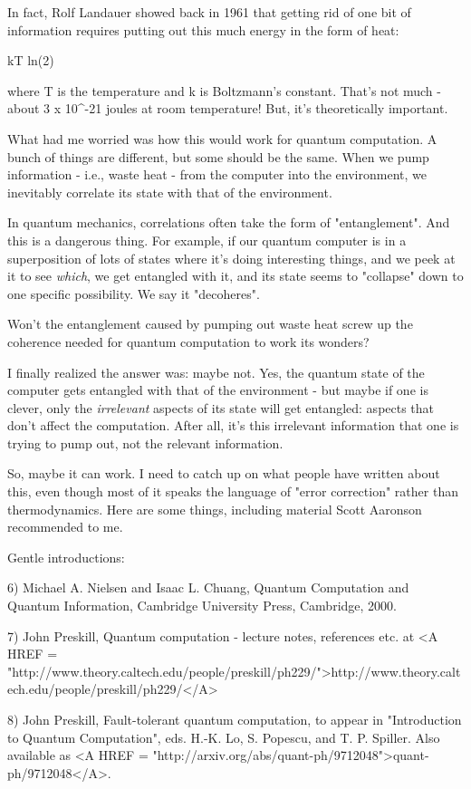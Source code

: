 In fact, Rolf Landauer showed back in 1961 that getting rid of 
one bit of information requires putting out this much energy 
in the form of heat:

kT ln(2)

where T is the temperature and k is Boltzmann's constant.  That's
not much - about 3 x 10^{-21} joules at room temperature!  But,
it's theoretically important.

What had me worried was how this would work for quantum computation.
A bunch of things are different, but some should be the same.  When 
we pump information - i.e., waste heat - from the computer into 
the environment, we inevitably correlate its state with that of the 
environment.  

In quantum mechanics, correlations often take the form of
"entanglement".  And this is a dangerous thing.  For
example, if our quantum computer is in a superposition of lots of
states where it's doing interesting things, and we peek at it to see
\emph{which}, we get entangled with it, and its state seems to
"collapse" down to one specific possibility.  We say it
"decoheres".
 
Won't the entanglement caused by pumping out waste heat screw up
the coherence needed for quantum computation to work its wonders?

I finally realized the answer was: maybe not.  Yes, the quantum state 
of the computer gets entangled with that of the environment - but 
maybe if one is clever, only the \emph{irrelevant} aspects of its state 
will get entangled: aspects that don't affect the computation.  After 
all, it's this irrelevant information that one is trying to pump out, 
not the relevant information.

So, maybe it can work.  I need to catch up on what people have written
about this, even though most of it speaks the language of "error
correction" rather than thermodynamics.  Here are some things,
including material Scott Aaronson recommended to me.

Gentle introductions:

6) Michael A. Nielsen and Isaac L. Chuang, Quantum Computation and 
Quantum Information, Cambridge University Press, Cambridge, 2000.
 
7) John Preskill, Quantum computation - lecture notes, references
etc. at <A HREF = "http://www.theory.caltech.edu/people/preskill/ph229/">http://www.theory.caltech.edu/people/preskill/ph229/</A>

8) John Preskill, Fault-tolerant quantum computation, to appear in
"Introduction to Quantum Computation", eds. H.-K. Lo,
S. Popescu, and T. P. Spiller.  Also available as <A HREF =
"http://arxiv.org/abs/quant-ph/9712048">quant-ph/9712048</A>.


